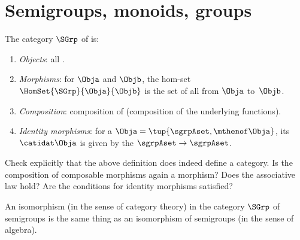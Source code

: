 
\section[Semigroups, monoids, groups]{Semigroups, monoids, groups}
\label{sec:cats-of-semigroups-monoids-groups}


\begin{ctdefinition}
    \label{def:SGrp}
    The category $\SGrp$ of  is:
    \begin{enumerate}
        \item \emph{Objects}: all .
        \item \emph{Morphisms}: for  $\Obja$ and $\Objb$, %
              the hom-set $\HomSet{\SGrp}{\Obja}{\Objb}$ is the set of all  from $\Obja$ to~$\Objb$.
        \item \emph{Composition}: composition of  (composition of the underlying functions).
        \item \emph{Identity morphisms}: for a  $\Obja = \tup{\sgrpAset, {{\mthenof \Obja}}}$, its  $\catidat\Obja$ is given by the  $\sgrpAset \to \sgrpAset$.
    \end{enumerate}
\end{ctdefinition}

\begin{gradedexercise}
    Check explicitly that the above definition does indeed define a category.
    Is the composition of composable morphisms again a morphism? Does the associative law hold? Are the conditions for identity morphisms satisfied?
\end{gradedexercise}


\begin{remark}
    An isomorphism (in the sense of category theory) in the category $\SGrp$ of semigroups is the same thing as an isomorphism of semigroups (in the sense of algebra).
\end{remark}

